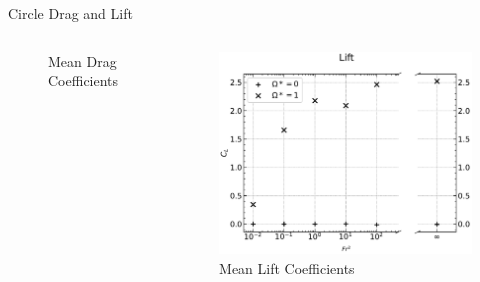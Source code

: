\documentclass[aspectratio=169,xcolor=dvipsnames]{beamer}
\begin{document}
\begin{frame}{Circle Drag and Lift}
\begin{columns}[c]
\begin{figure}
            \caption{Mean Drag Coefficients}
        \end{figure}
        \vspace{-10pt}
        \begin{figure}
            \includegraphics[width=\textwidth]{figures/circlelift.pdf}
            \caption{Mean Lift Coefficients}
        \end{figure}
    \end{columns}
\end{frame}

\end{document}
